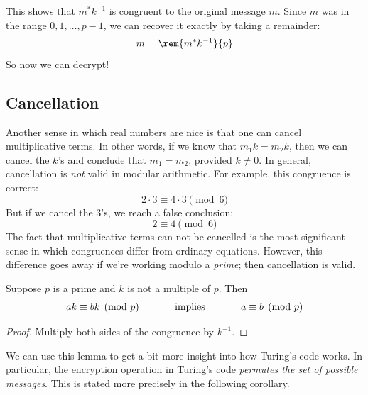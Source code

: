 This shows that $m^* k^{-1}$ is congruent to the original message $m$.
Since $m$ was in the range $0, 1, \dots, p - 1$, we can recover
it exactly by taking a remainder:
%
\[
m = \rem{m^* k^{-1}}{p}
\]
%
So now we can decrypt!

\subsection{Cancellation}

Another sense in which real numbers are nice is that one can cancel
multiplicative terms.  In other words, if we know that $m_1 k = m_2 k$,
then we can cancel the $k$'s and conclude that $m_1 = m_2$, provided $k
\neq 0$.  In general, cancellation is \emph{not} valid in modular
arithmetic.  For example, this congruence is correct:
%
\[
2 \cdot 3 \equiv 4 \cdot 3 \pmod{6}
\]
%
But if we cancel the 3's, we reach a false conclusion:
%
\[
2 \equiv 4 \pmod{6}
\]
%
The fact that multiplicative terms can not be cancelled is the most
significant sense in which congruences differ from ordinary equations.
However, this difference goes away if we're working modulo a
\emph{prime}; then cancellation is valid.

\begin{lemma}
\label{lem:cancel}
Suppose $p$ is a prime and $k$ is not a multiple of $p$.  Then
%
\[
ak \equiv bk \pmod{p}
\hspace{0.5in} \text{implies} \hspace{0.5in}
a \equiv b \pmod{p}
\]
\end{lemma}

\begin{proof}
Multiply both sides of the congruence by $k^{-1}$.
\end{proof}

We can use this lemma to get a bit more insight into how Turing's code
works.  In particular, the encryption operation in Turing's code
\emph{permutes the set of possible messages}.  This is stated more
precisely in the following corollary.


